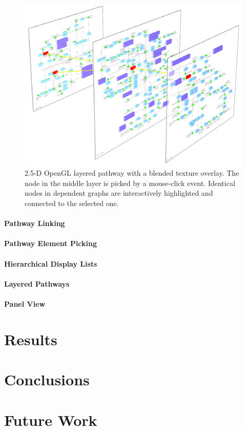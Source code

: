 \begin{figure}[ht]
  \centering
    \includegraphics[width=0.7\linewidth]{gfx/opengl_layered_pathway}
  \caption{2.5-D OpenGL layered pathway with a blended texture overlay. The node in the middle layer is picked by a mouse-click event. Identical nodes in dependent graphs are interactively highlighted and connected to the selected one.}
  \label{fig:opengl_layered_pathway}
\end{figure}

\subsubsection{Pathway Linking}


\subsubsection{Pathway Element Picking}


\subsubsection{Hierarchical Display Lists}

\citep{Shreiner2005}

\subsubsection{Layered Pathways}

\subsubsection{Panel View}

\chapter{Results}


\chapter{Conclusions}

\chapter{Future Work}



